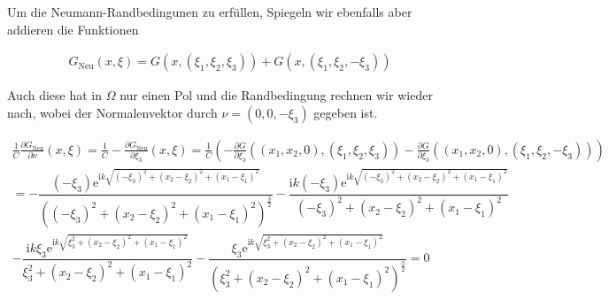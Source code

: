 \begin{solution}
\begin{enumerate}[label = (\roman*)]
Um die Neumann-Randbedingunen zu erfüllen, Spiegeln wir ebenfalls aber addieren die Funktionen

\begin{align*}
  G_\mathrm{Neu}(x,\xi) = G(x,(\xi_1, \xi_2, \xi_3)) + G(x,(\xi_1,\xi_2, -\xi_3))
\end{align*}

Auch diese hat in $\Omega$ nur einen Pol und die Randbedingung rechnen wir wieder nach, wobei der Normalenvektor durch $\nu = (0,0,-\xi_3)$ gegeben ist.

\begin{align*}
  \frac{1}{C}\frac{\partial G_\mathrm{Neu}}{\partial \nu}(x, \xi)
  =
  \frac{1}{C}-\frac{\partial G_\mathrm{Neu}}{\partial \xi_3}(x, \xi)
  =
  \frac{1}{C}(-\frac{\partial G}{\partial \xi_3}((x_1,x_2,0),(\xi_1, \xi_2, \xi_3)) -\frac{\partial G}{\partial \xi_3}((x_1,x_2,0),(\xi_1,\xi_2, -\xi_3))) \\
  =
  -\dfrac{\left(-{\xi}_3\right)\mathrm{e}^{\mathrm{i}k\sqrt{\left(-{\xi}_3\right)^2+\left(x_2-{\xi}_2\right)^2+\left(x_1-{\xi}_1\right)^2}}}{\left(\left(-{\xi}_3\right)^2+\left(x_2-{\xi}_2\right)^2+\left(x_1-{\xi}_1\right)^2\right)^\frac{3}{2}}-\dfrac{\mathrm{i}k\left(-{\xi}_3\right)\mathrm{e}^{\mathrm{i}k\sqrt{\left(-{\xi}_3\right)^2+\left(x_2-{\xi}_2\right)^2+\left(x_1-{\xi}_1\right)^2}}}{\left(-{\xi}_3\right)^2+\left(x_2-{\xi}_2\right)^2+\left(x_1-{\xi}_1\right)^2} \\
  -
  \dfrac{\mathrm{i}k\xi_3\mathrm{e}^{\mathrm{i}k\sqrt{\xi_3^2+\left(x_2-{\xi}_2\right)^2+\left(x_1-{\xi}_1\right)^2}}}{\xi_3^2+\left(x_2-{\xi}_2\right)^2+\left(x_1-{\xi}_1\right)^2}-\dfrac{\xi_3\mathrm{e}^{\mathrm{i}k\sqrt{\xi_3^2+\left(x_2-{\xi}_2\right)^2+\left(x_1-{\xi}_1\right)^2}}}{\left(\xi_3^2+\left(x_2-{\xi}_2\right)^2+\left(x_1-{\xi}_1\right)^2\right)^\frac{3}{2}}
  =
  0
\end{align*}
\end{enumerate}
\end{solution}

